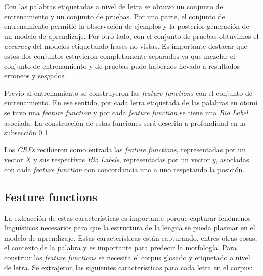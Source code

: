 \documentclass[letterpaper,12pt,oneside]{book}
\theoremstyle{definition}
\begin{document}
Con las palabras etiquetadas a nivel de letra se obtuvo un conjunto de entrenamiento y un conjunto de pruebas. Por una parte, el conjunto de entrenamiento permitió la observación de ejemplos y la posterior generación de un modelo de aprendizaje. Por otro lado, con el conjunto de pruebas obtuvimos el \textit{accuracy} del modelos etiquetando frases no vistas. Es importante destacar que estos dos conjuntos estuvieron completamente separados ya que mezclar el conjunto de entrenamiento y de pruebas pudo habernos llevado a resultados erroneos y sesgados.

Previo al entrenamiento se construyeron las \textit{feature functions} con el conjunto de entrenamiento. En ese sentido, por cada letra etiquetada de las palabras en otomí se tuvo una \textit{feature function} y por cada \textit{feature function} se tiene una \textit{Bio Label} asociada. La construcción de estas funciones será descrita a profundidad en la subsección \ref{subsec:feature}.


Los \textit{CRFs} recibieron como entrada las \textit{feature functions}, representadas por un vector $X$ y sus respectivas \textit{Bio Labels}, representadas por un vector $y$, asociadas con cada \textit{feature function} con concordancia uno a uno respetando la posición. 

\subsection{Feature functions} \label{subsec:feature}

La extracción de estas características es importante porque capturar fenómenos lingüísticos necesarios para que la estructura de la lengua se pueda plasmar en el modelo de aprendizaje. Estas características están capturando, entres otras cosas, el contexto de la palabra y es importante para predecir la morfología. Para construir las \textit{feature functions} se necesita el corpus glosado y etiquetado a nivel de letra. Se extrajeron las siguientes características para cada letra en el corpus:
\end{document}
